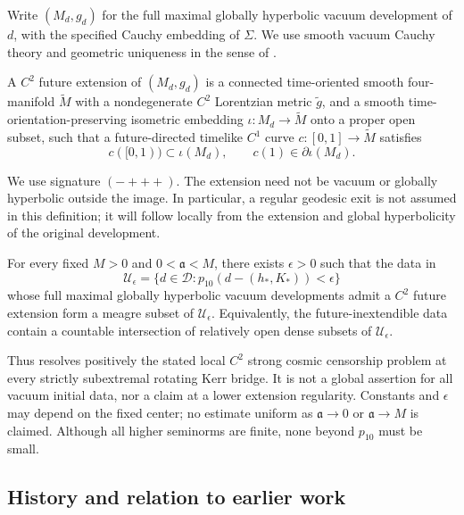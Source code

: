 Write \((M_d,g_d)\) for the full maximal globally hyperbolic vacuum
development of \(d\), with the specified Cauchy embedding of \(\Sigma\).
We use smooth vacuum Cauchy theory and geometric uniqueness in the sense
of \cite{ChoquetBruhat1952,ChoquetBruhatGeroch1969}.

\begin{definition}\label{intro:extension}
A \(C^2\) future extension of \((M_d,g_d)\) is a connected time-oriented
smooth four-manifold \(\widetilde M\) with a nondegenerate \(C^2\)
Lorentzian metric \(\widetilde g\), and a smooth time-orientation-preserving
isometric embedding \(\iota:M_d\longrightarrow\widetilde M\) onto a
proper open subset, such that a future-directed timelike \(C^1\) curve
\(c:[0,1]\longrightarrow\widetilde M\) satisfies
\[
 c([0,1))\subset\iota(M_d),\qquad
 c(1)\in\partial\iota(M_d).
\]
\end{definition}
We use signature \((-+++ )\). The extension need not be vacuum or
globally hyperbolic outside the image. In particular, a regular geodesic
exit is not assumed in this definition; it will follow locally from
the extension and global hyperbolicity of the original development.

\begin{theorem}\label{thm:main}
For every fixed \(M>0\) and \(0<\mathfrak a<M\), there exists
\(\epsilon>0\) such that the data in
\[
 \mathcal U_\epsilon
 =\{d\in\mathcal D:p_{10}(d-(h_*,K_*))<\epsilon\}
\]
whose full maximal globally hyperbolic vacuum developments admit a
\(C^2\) future extension form a meagre subset of \(\mathcal U_\epsilon\).
Equivalently, the future-inextendible data contain a countable intersection
of relatively open dense subsets of \(\mathcal U_\epsilon\).
\end{theorem}

Thus  resolves positively the stated local \(C^2\)
strong cosmic censorship problem at every strictly subextremal rotating
Kerr bridge. It is not a global assertion for all vacuum initial data,
nor a claim at a lower extension regularity. Constants and
\(\epsilon\) may depend on the fixed center; no estimate uniform as
\(\mathfrak a\to0\) or \(\mathfrak a\to M\) is claimed. Although
all higher seminorms are finite, none beyond \(p_{10}\) must be small.

\subsection{History and relation to earlier work}



